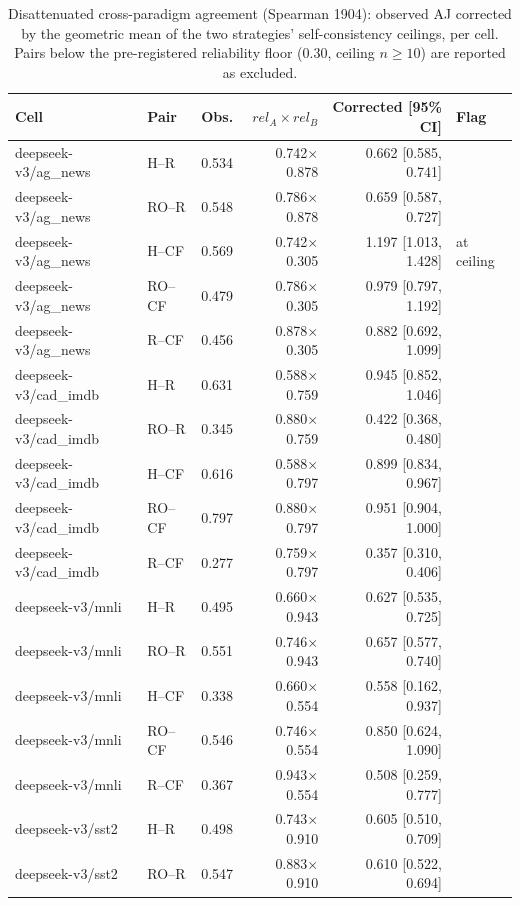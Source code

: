 \begin{table}[t]
\centering
\caption{Disattenuated cross-paradigm agreement (Spearman 1904): observed AJ corrected by the geometric mean of the two strategies' self-consistency ceilings, per cell. Pairs below the pre-registered reliability floor (0.30, ceiling $n \geq 10$) are reported as excluded.}
\label{tab:disattenuated}
\begin{tabular}{llrrrl}
\toprule
Cell & Pair & Obs. & $rel_A{\times}rel_B$ & Corrected [95\% CI] & Flag \\
\midrule
deepseek-v3/ag_news & H--R & 0.534 & 0.742$\times$0.878 & 0.662 [0.585, 0.741] &  \\
deepseek-v3/ag_news & RO--R & 0.548 & 0.786$\times$0.878 & 0.659 [0.587, 0.727] &  \\
deepseek-v3/ag_news & H--CF & 0.569 & 0.742$\times$0.305 & 1.197 [1.013, 1.428] & at ceiling \\
deepseek-v3/ag_news & RO--CF & 0.479 & 0.786$\times$0.305 & 0.979 [0.797, 1.192] &  \\
deepseek-v3/ag_news & R--CF & 0.456 & 0.878$\times$0.305 & 0.882 [0.692, 1.099] &  \\
deepseek-v3/cad_imdb & H--R & 0.631 & 0.588$\times$0.759 & 0.945 [0.852, 1.046] &  \\
deepseek-v3/cad_imdb & RO--R & 0.345 & 0.880$\times$0.759 & 0.422 [0.368, 0.480] &  \\
deepseek-v3/cad_imdb & H--CF & 0.616 & 0.588$\times$0.797 & 0.899 [0.834, 0.967] &  \\
deepseek-v3/cad_imdb & RO--CF & 0.797 & 0.880$\times$0.797 & 0.951 [0.904, 1.000] &  \\
deepseek-v3/cad_imdb & R--CF & 0.277 & 0.759$\times$0.797 & 0.357 [0.310, 0.406] &  \\
deepseek-v3/mnli & H--R & 0.495 & 0.660$\times$0.943 & 0.627 [0.535, 0.725] &  \\
deepseek-v3/mnli & RO--R & 0.551 & 0.746$\times$0.943 & 0.657 [0.577, 0.740] &  \\
deepseek-v3/mnli & H--CF & 0.338 & 0.660$\times$0.554 & 0.558 [0.162, 0.937] &  \\
deepseek-v3/mnli & RO--CF & 0.546 & 0.746$\times$0.554 & 0.850 [0.624, 1.090] &  \\
deepseek-v3/mnli & R--CF & 0.367 & 0.943$\times$0.554 & 0.508 [0.259, 0.777] &  \\
deepseek-v3/sst2 & H--R & 0.498 & 0.743$\times$0.910 & 0.605 [0.510, 0.709] &  \\
deepseek-v3/sst2 & RO--R & 0.547 & 0.883$\times$0.910 & 0.610 [0.522, 0.694] &  \\

\end{tabular}
\end{table}
